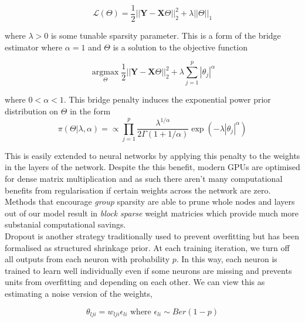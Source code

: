 \documentclass[honours,12pt]{unswthesis}
\numberwithin{equation}{section}
\begin{document}
\begin{equation}
    \mathcal{L}(\Theta) = \frac{1}{2}||\textbf{Y} - \textbf{X}\Theta||^2_2 + \lambda||\Theta||_1
\end{equation}

{\noindent}where $\lambda > 0$ is some tunable sparsity parameter.
This is a form of the bridge estimator\cite{frank1993statistical} where $\alpha = 1$ and $\Theta$ is a solution to the objective function

\begin{equation}
    \underset{\Theta}{\operatorname{argmax}} \frac{1}{2}||\textbf{Y} - \textbf{X}\Theta||^2_2 + \lambda \sum_{j=1}^{p} |\theta_j|^\alpha
\end{equation}

{\noindent}where $0 < \alpha < 1$. This bridge penalty induces the exponential power prior distribution on $\Theta$ in the form
\begin{equation}
    \pi(\Theta | \lambda, \alpha) = \propto \prod_{j=1}^{p} \frac{\lambda^{1/\alpha}}{2\Gamma(1 + 1/\alpha)} \exp(- \lambda |\theta_j|^\alpha)
\end{equation}

{\noindent}This is easily extended to neural networks by applying this penalty to the weights in the layers of the network.\cite{ma2019transformed}
Despite the this benefit, modern GPUs are optimised for dense matrix multiplication and as such there aren't many computational benefits from regularisation if certain weights across the network are zero.
Methods that encourage \textit{group} sparsity are able to prune whole nodes and layers out of our model result in \textit{block sparse} weight matricies which provide much more substanial computational savings.
\cite{scardapane2017group}\cite{wen2016learning}\cite{molchanov2017variational}\cite{louizos2017bayesian} \\

{\noindent}Dropout\cite{srivastava2014dropout} is another strategy traditionally used to prevent overfitting but has been formalised as structured shrinkage prior.\cite{nalisnick2019dropout}
At each training iteration, we turn off all outputs from each neuron with probability $p$. 
In this way, each neuron is trained to learn well individually even if some neurons are missing and prevents units from overfitting and depending on each other. 
We can view this as estimating a noise version of the weights\cite{pml1Book},

\begin{equation}
    \theta_{lji} = w_{lji}\epsilon_{li} \text{ where } \epsilon_{li} \sim Ber(1-p)
\end{equation}
\end{document}

